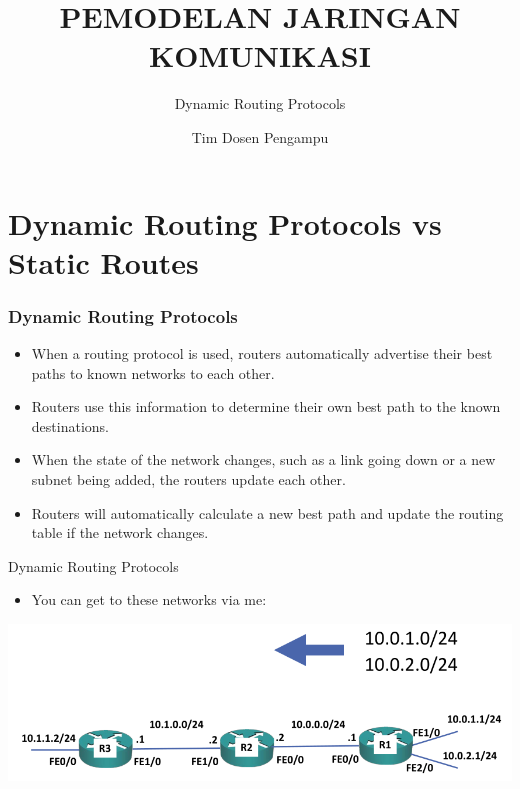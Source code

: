 \documentclass[pdflatex,compress,mathserif]{beamer}
\title{PEMODELAN JARINGAN KOMUNIKASI}
\subtitle{Dynamic Routing Protocols}
\author{Tim Dosen Pengampu}
\begin{document}
\maketitle

\section{Dynamic Routing Protocols vs Static Routes}

\begin{frame}
	\frametitle{Dynamic Routing Protocols}
	\begin{itemize}
		\item When a routing protocol is used, routers automatically advertise their
 best paths to known networks to each other.
		\item Routers use this information to determine their own best path to the
 known destinations.
		\item When the state of the network changes, such as a link going down or a
 new subnet being added, the routers update each other.
		\item Routers will automatically calculate a new best path and update the
 routing table if the network changes.
	\end{itemize}
\end{frame}

\begin{frame}{Dynamic Routing Protocols}
	\begin{itemize}
		\item You can get to these networks via me:
	\end{itemize}
	\begin{center}
		\includegraphics[width=\linewidth]{img/img01}
	\end{center}
\end{frame}
\end{document}
